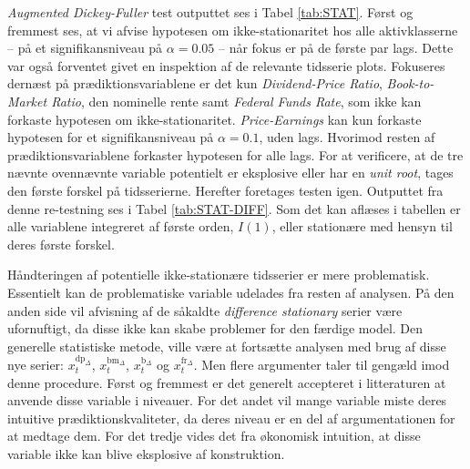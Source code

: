 \documentclass[
  a4paper,
  oneside]{memoir}
\begin{document}
\emph{Augmented Dickey-Fuller} test outputtet ses i Tabel \ref{tab:STAT}. Først og fremmest ses, at vi afvise hypotesen om ikke-stationaritet hos alle aktivklasserne -- på et signifikansniveau på \(\alpha=0.05\) -- når fokus er på de første par lags. Dette var også forventet givet en inspektion af de relevante tidsserie plots. Fokuseres dernæst på prædiktionsvariablene er det kun \emph{Dividend-Price Ratio}, \emph{Book-to-Market Ratio}, den nominelle rente samt \emph{Federal Funds Rate}, som ikke kan forkaste hypotesen om ikke-stationaritet. \emph{Price-Earnings} kan kun forkaste hypotesen for et signifikansniveau på \(\alpha=0.1\), uden lags. Hvorimod resten af prædiktionsvariablene forkaster hypotesen for alle lags. For at verificere, at de tre nævnte ovennævnte variable potentielt er eksplosive eller har en \emph{unit root}, tages den første forskel på tidsserierne. Herefter foretages testen igen. Outputtet fra denne re-testning ses i Tabel \ref{tab:STAT-DIFF}. Som det kan aflæses i tabellen er alle variablene integreret af første orden, \(I(1)\), eller stationære med hensyn til deres første forskel.

Håndteringen af potentielle ikke-stationære tidsserier er mere problematisk. Essentielt kan de problematiske variable udelades fra resten af analysen. På den anden side vil afvisning af de såkaldte \emph{difference stationary} serier være ufornuftigt, da disse ikke kan skabe problemer for den færdige model. Den generelle statistiske metode, ville være at fortsætte analysen med brug af disse nye serier: \(x_t^{\text{dp}_{\Delta}}\), \(x_t^{\text{bm}_{\Delta}}\), \(x_t^{\text{b}_{\Delta}}\) og \(x_t^{\text{fr}_{\Delta}}\). Men flere argumenter taler til gengæld imod denne procedure. Først og fremmest er det generelt accepteret i litteraturen at anvende disse variable i niveauer. For det andet vil mange variable miste deres intuitive prædiktionskvaliteter, da deres niveau er en del af argumentationen for at medtage dem. For det tredje vides det fra økonomisk intuition, at disse variable ikke kan blive eksplosive af konstruktion.
\end{document}
